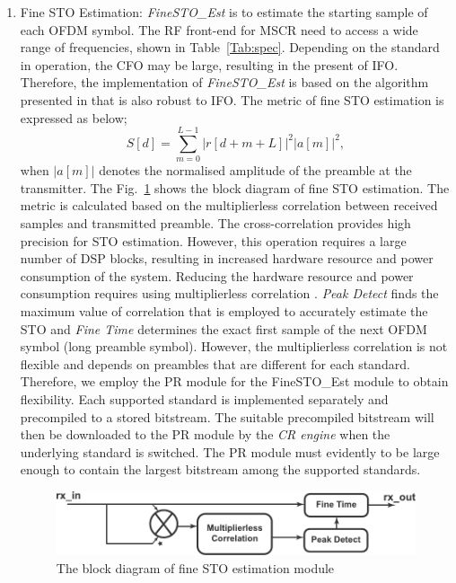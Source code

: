 \begin{enumerate}
\item{Fine STO Estimation:}
\emph{FineSTO\_Est} is to estimate the starting sample of each OFDM symbol. 
The RF front-end for MSCR need to access a wide range of frequencies, shown in Table~\ref{Tab:spec}. Depending on the standard in operation, the CFO may be large, resulting in the present of IFO.
Therefore, the implementation of \emph{FineSTO\_Est} is based on the algorithm presented in \cite{Pham2014} that is also robust to IFO.
The metric of fine STO estimation is expressed as below;
\begin{equation}
\label{ProposedR}
S[d] =\sum_{m =0}^{L-1}   |r[d+m+L]|^2  |a[m]|^2,
\end{equation}
when $|a[m]|$ denotes the normalised amplitude of the preamble at the transmitter.
The Fig.~\ref{fig:STO} shows the block diagram of fine STO estimation.
The metric is calculated based on the multiplierless correlation between received samples and transmitted preamble.
The cross-correlation provides high precision for STO estimation. 
However, this operation requires a large number of DSP blocks, resulting in increased hardware resource and power consumption of the system.
Reducing the hardware resource and power consumption requires using multiplierless correlation \cite{Pham2012}.
\emph{Peak Detect} finds the maximum value of correlation that is employed to accurately estimate the STO and \emph{Fine Time} determines the exact first sample of the next OFDM symbol (long preamble symbol).
However, the multiplierless correlation is not flexible and depends on preambles that are different for each standard.
Therefore, we employ the PR module for the {FineSTO\_Est} module to obtain flexibility.
Each supported standard is implemented separately and precompiled to a stored bitstream.
The suitable precompiled bitstream will then be downloaded to the PR module by the \emph{CR engine} when the underlying standard is switched.
The PR module must evidently to be large enough to contain the largest bitstream among the supported standards.
\begin{figure}
\centering
\includegraphics [width=0.9\columnwidth]{Figures/MSCR_RX_STO.pdf}
\caption{The block diagram of fine STO estimation module}
\label{fig:STO}
\end{figure}


\end{enumerate}
